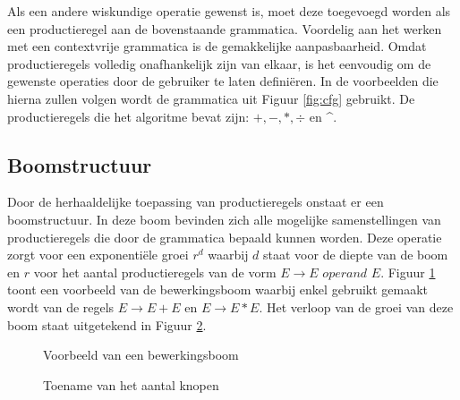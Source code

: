 \documentclass[Main.tex]{subfiles}
\begin{document}
Als een andere wiskundige operatie gewenst is, moet deze toegevoegd worden als een productieregel aan de bovenstaande grammatica. Voordelig aan het werken met een contextvrije grammatica is de gemakkelijke aanpasbaarheid. Omdat productieregels volledig onafhankelijk zijn van elkaar, is het eenvoudig om de gewenste operaties door de gebruiker te laten defini\"eren. In de voorbeelden die hierna zullen volgen wordt de grammatica uit Figuur \ref{fig:cfg} gebruikt. De productieregels die het algoritme bevat zijn: $+, -, \ast, \div$ en \^{}.

\subsection{Boomstructuur}

Door de herhaaldelijke toepassing van productieregels onstaat er een boomstructuur. In deze boom bevinden zich alle mogelijke samenstellingen van productieregels die door de grammatica bepaald kunnen worden. Deze operatie zorgt voor een exponenti\"ele groei $r^{d}$ waarbij $d$ staat voor de diepte van de boom en $r$ voor het aantal productieregels van de vorm $E \rightarrow E$  $operand$ $ E$. Figuur \ref{fig:vbBoom} toont een voorbeeld van de bewerkingsboom waarbij enkel gebruikt gemaakt wordt van de regels $E \rightarrow E+E$ en $E \rightarrow E \ast E$. Het verloop van de groei van deze boom staat uitgetekend in Figuur \ref{fig:treeSize}.

\begin{figure}[!htb]
\centering
{}
\caption{Voorbeeld van een bewerkingsboom} \label{fig:vbBoom}
\end{figure}

\begin{figure}[!htb]
\centering
{}
\caption{Toename van het aantal knopen}
\label{fig:treeSize}
\end{figure}
\end{document}
